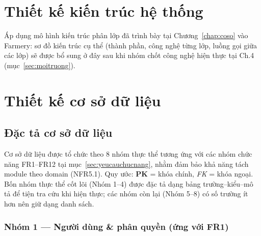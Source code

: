 \section{Thiết kế kiến trúc hệ thống}
\label{sec:kientruc}

Áp dụng mô hình kiến trúc phân lớp đã trình bày tại Chương~\ref{chap:coso} vào Farmery: sơ đồ kiến trúc cụ thể (thành phần, công nghệ từng lớp, luồng gọi giữa các lớp) sẽ được bổ sung ở đây sau khi nhóm chốt công nghệ hiện thực tại Ch.4 (mục~\ref{sec:moitruong}).

\section{Thiết kế cơ sở dữ liệu}
\label{sec:csdl}

\subsection{Đặc tả cơ sở dữ liệu}
\label{subsec:dacta-csdl}

Cơ sở dữ liệu được tổ chức theo 8 nhóm thực thể tương ứng với các nhóm chức
năng FR1--FR12 tại mục~\ref{sec:yeucauchucnang}, nhằm đảm bảo khả năng tách
module theo domain (NFR5.1). Quy ước: \textbf{PK} = khóa chính,
\textit{FK} = khóa ngoại. Bốn nhóm thực thể cốt lõi (Nhóm 1--4) được đặc tả
dạng bảng trường--kiểu--mô tả để tiện tra cứu khi hiện thực; các nhóm còn lại
(Nhóm 5--8) có số trường ít hơn nên giữ dạng danh sách.
 
\subsubsection*{Nhóm 1 --- Người dùng \& phân quyền (ứng với FR1)}
 
